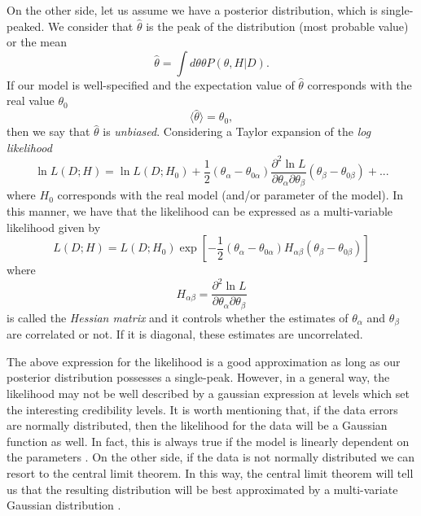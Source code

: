 \documentclass[onecolumn,           %
               showpacs,            %
               preprintnumbers,     %
               aps,                 %
               prl,          	    %
               letterpaper,             %
               superscriptaddress,      %
               nofootinbib,         %
               tightenlines,        %
               floats,floatfix      %
               ,usenatbib,
               ]{revtex4-1}
\begin{document}
On the other side, let us assume we have a posterior distribution, which is single-peaked. We consider that $\hat \theta$ is the peak of the distribution (most probable value) or the mean
\begin{equation}
\hat \theta =\int d\theta \theta P(\theta,H|D).
\end{equation}
If our model is well-specified and the expectation value of $\hat \theta$ corresponds with the real value $\theta_0$
\begin{equation}
\langle\hat \theta\rangle=\theta_0,
\end{equation}
then we say that $\hat \theta$ is \textit{unbiased}. Considering a Taylor expansion of the \textit{log likelihood}
\begin{equation}
\ln L(D;H)=\ln L(D;H_0)+\frac{1}{2}(\theta_\alpha-\theta_{0\alpha})\frac{\partial^2\ln L}{\partial\theta_\alpha \partial\theta_\beta}(\theta_\beta-\theta_{0\beta})+...
\end{equation}
where $H_0$ corresponds with the real model (and/or parameter of the model). In this manner, we have that the likelihood can be expressed as a multi-variable likelihood given by 
\begin{equation}\label{GLik}
L(D;H)=L(D;H_0)\exp \left[-\frac{1}{2}(\theta_\alpha-\theta_{0\alpha})H_{\alpha\beta}(\theta_\beta-\theta_{0\beta})\right]
\end{equation}
where 
\begin{equation}
H_{\alpha\beta}=\frac{\partial^2\ln L}{\partial\theta_\alpha \partial\theta_\beta}
\end{equation}
is called the \textit{Hessian matrix} and it controls whether the estimates of $\theta_\alpha$ and $\theta_\beta$ are correlated or not. If it is diagonal, these estimates are uncorrelated.

The above expression for the likelihood is a good approximation as long as our posterior distribution possesses a single-peak. However, in a general way, the likelihood may not be well described by a gaussian expression at levels which set the interesting credibility levels. It is worth mentioning that, if the data errors are normally distributed, then the likelihood for the data will be a Gaussian function as well.  In fact, this is always true if the model is linearly dependent on the parameters \cite{LiV}. On the other side, if the data is not normally distributed we can resort to the central limit theorem. In this way, the central limit theorem will tell us that the resulting distribution will be best approximated by a multi-variate Gaussian distribution \cite{LiV}.
\end{document}
